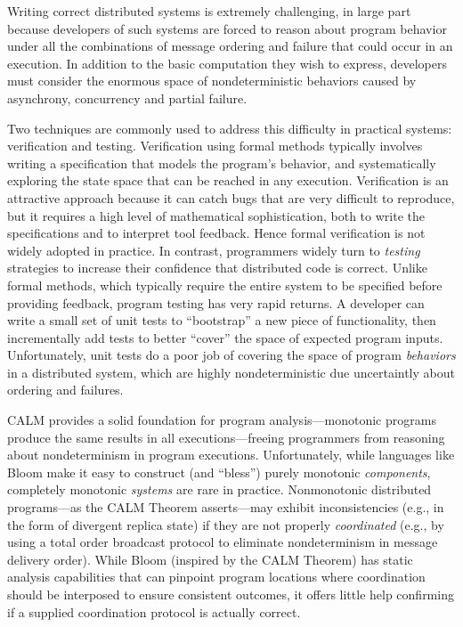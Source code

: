 
Writing correct distributed systems is extremely challenging, in large part
because developers of such systems are forced to reason
about program behavior under all the combinations of message ordering and failure
that could occur in an execution.
In addition to the basic computation they wish to express, developers
must consider the enormous space of nondeterministic behaviors caused by 
asynchrony, concurrency and partial failure.

Two techniques are commonly used
to address this difficulty in practical systems: verification and testing.
Verification using formal methods typically involves writing a specification
that models the program's behavior, and systematically exploring the state 
space that can be reached in any execution.  Verification is an attractive 
approach because it can catch bugs that are very difficult to reproduce,
but it requires a high level of mathematical sophistication, both to write the 
specifications and to interpret tool feedback.
Hence formal verification is not widely adopted in practice.  
In contrast, programmers widely turn to \emph{testing} strategies to increase
their confidence that distributed code is correct.  Unlike formal methods, 
which typically require the entire system to be specified before providing 
feedback, program testing has very rapid returns.  A developer can write a 
small set of unit tests to ``bootstrap'' a new piece of functionality, then
incrementally add tests to better ``cover'' the space of expected program 
inputs.  Unfortunately, unit tests do a poor job of covering the space of
program \emph{behaviors} in a distributed system, which are highly
nondeterministic due uncertaintly about ordering and failures.

CALM provides a solid foundation for program analysis---monotonic programs
produce the same results in all executions---freeing programmers from reasoning
about nondeterminism in program executions.  Unfortunately, while languages
like Bloom make it easy to construct (and ``bless'') purely monotonic 
\emph{components}, completely monotonic \emph{systems} are rare in practice.
Nonmonotonic distributed programs---as the CALM Theorem asserts---may exhibit
inconsistencies (e.g., in the form of divergent replica state)
if they are not
properly \emph{coordinated} (e.g., by using a total order broadcast protocol
to eliminate nondeterminism in message delivery order).
While Bloom (inspired by the CALM Theorem) has static analysis capabilities
that can pinpoint program locations where coordination should be interposed
to ensure consistent outcomes, it offers little help confirming if a supplied
coordination protocol is actually correct.

